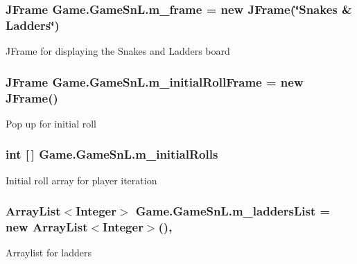 \subsubsection[{m\+\_\+frame}]{\setlength{\rightskip}{0pt plus 5cm}J\+Frame Game.\+Game\+Sn\+L.\+m\+\_\+frame = new J\+Frame(\char`\"{}Snakes \& Ladders\char`\"{})\hspace{0.3cm}{\ttfamily [private]}}\label{class_game_1_1_game_sn_l_a694cff89aec27b85a6b970b2304c6968}
J\+Frame for displaying the Snakes and Ladders board \hypertarget{class_game_1_1_game_sn_l_ae665665dd40de7d795777635000da8eb}{}
\subsubsection[{m\+\_\+initial\+Roll\+Frame}]{\setlength{\rightskip}{0pt plus 5cm}J\+Frame Game.\+Game\+Sn\+L.\+m\+\_\+initial\+Roll\+Frame = new J\+Frame()\hspace{0.3cm}{\ttfamily [private]}}\label{class_game_1_1_game_sn_l_ae665665dd40de7d795777635000da8eb}
Pop up for initial roll \hypertarget{class_game_1_1_game_sn_l_a005ffc3118d467caff14a7afdc68a520}{}
\subsubsection[{m\+\_\+initial\+Rolls}]{\setlength{\rightskip}{0pt plus 5cm}int \mbox{[}$\,$\mbox{]} Game.\+Game\+Sn\+L.\+m\+\_\+initial\+Rolls\hspace{0.3cm}{\ttfamily [private]}}\label{class_game_1_1_game_sn_l_a005ffc3118d467caff14a7afdc68a520}
Initial roll array for player iteration \hypertarget{class_game_1_1_game_sn_l_a0b47e32e0960ed988d341b31b5f3bd3b}{}
\subsubsection[{m\+\_\+ladders\+List}]{\setlength{\rightskip}{0pt plus 5cm}Array\+List$<$Integer$>$ Game.\+Game\+Sn\+L.\+m\+\_\+ladders\+List = new Array\+List$<$Integer$>$()\hspace{0.3cm}{\ttfamily [static]}, {\ttfamily [private]}}\label{class_game_1_1_game_sn_l_a0b47e32e0960ed988d341b31b5f3bd3b}
Arraylist for ladders \hypertarget{class_game_1_1_game_sn_l_af8c7ff07d44c8713db098772d7888478}{}
